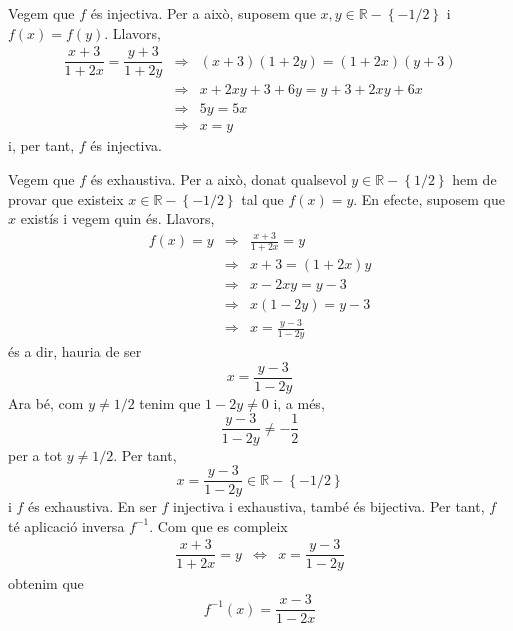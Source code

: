\begin{solucio}
Vegem que $f$ és injectiva. Per a això, suposem que $x,y\in \mathbb{R%
}-\left\{ -1/2\right\} $ i $f(x)=f(y)$. Llavors,%
\begin{equation*}
\begin{array}{lll}
\dfrac{x+3}{1+2x}=\dfrac{y+3}{1+2y} & \Longrightarrow &
(x+3)(1+2y)=(1+2x)(y+3) \\
& \Longrightarrow & x+2xy+3+6y=y+3+2xy+6x \\
& \Longrightarrow & 5y=5x \\
& \Longrightarrow & x=y%
\end{array}%
\end{equation*}%
i, per tant, $f$ és injectiva.

Vegem que $f$ és exhaustiva. Per a això, donat qualsevol $y\in
\mathbb{R}-\left\{ 1/2\right\} $ hem de provar que existeix $x\in \mathbb{R}%
-\left\{ -1/2\right\} $ tal que $f(x)=y$. En efecte, suposem que $x$ existís i vegem quin és. Llavors,%
\begin{equation*}
\begin{array}{lll}
f(x)=y & \Longrightarrow & \frac{x+3}{1+2x}=y \\
& \Longrightarrow & x+3=(1+2x)y \\
& \Longrightarrow & x-2xy=y-3 \\
& \Longrightarrow & x(1-2y)=y-3 \\
& \Longrightarrow & x=\frac{y-3}{1-2y}%
\end{array}%
\end{equation*}%
és a dir, hauria de ser
\begin{equation*}
x=\frac{y-3}{1-2y}
\end{equation*}%
Ara bé, com $y\neq 1/2$ tenim que $1-2y\neq 0$ i, a més,
\begin{equation*}
\frac{y-3}{1-2y}\neq -\frac{1}{2}
\end{equation*}%
per a tot $y\neq 1/2$. Per tant,%
\begin{equation*}
x=\frac{y-3}{1-2y}\in \mathbb{R}-\left\{ -1/2\right\}
\end{equation*}%
i $f$ és exhaustiva. En ser $f$ injectiva i exhaustiva, també és
bijectiva. Per tant, $f$ té aplicació inversa $f^{-1}$. Com que es
compleix%
\begin{equation*}
\begin{array}{ccc}
\dfrac{x+3}{1+2x}=y & \Longleftrightarrow & x=\dfrac{y-3}{1-2y}%
\end{array}%
\end{equation*}%
obtenim que%
\begin{equation*}
f^{-1}(x)=\frac{x-3}{1-2x}
\end{equation*}
\end{solucio}

